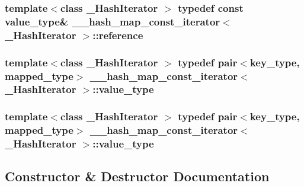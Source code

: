 \subsubsection[{reference}]{\setlength{\rightskip}{0pt plus 5cm}template$<$class \+\_\+\+Hash\+Iterator $>$ typedef const {\bf value\+\_\+type}\& {\bf \+\_\+\+\_\+hash\+\_\+map\+\_\+const\+\_\+iterator}$<$ \+\_\+\+Hash\+Iterator $>$\+::{\bf reference}}\label{class____hash__map__const__iterator_a94a3447535fb67a3c48b0acded52fd84}
\hypertarget{class____hash__map__const__iterator_aa5fda7b5c351e3103cfa5bf694b500b4}{}
\subsubsection[{value\+\_\+type}]{\setlength{\rightskip}{0pt plus 5cm}template$<$class \+\_\+\+Hash\+Iterator $>$ typedef pair$<$key\+\_\+type, mapped\+\_\+type$>$ {\bf \+\_\+\+\_\+hash\+\_\+map\+\_\+const\+\_\+iterator}$<$ \+\_\+\+Hash\+Iterator $>$\+::{\bf value\+\_\+type}}\label{class____hash__map__const__iterator_aa5fda7b5c351e3103cfa5bf694b500b4}
\hypertarget{class____hash__map__const__iterator_aa5fda7b5c351e3103cfa5bf694b500b4}{}
\subsubsection[{value\+\_\+type}]{\setlength{\rightskip}{0pt plus 5cm}template$<$class \+\_\+\+Hash\+Iterator $>$ typedef pair$<$key\+\_\+type, mapped\+\_\+type$>$ {\bf \+\_\+\+\_\+hash\+\_\+map\+\_\+const\+\_\+iterator}$<$ \+\_\+\+Hash\+Iterator $>$\+::{\bf value\+\_\+type}}\label{class____hash__map__const__iterator_aa5fda7b5c351e3103cfa5bf694b500b4}


\subsection{Constructor \& Destructor Documentation}
\hypertarget{class____hash__map__const__iterator_a8901fc740c6c0594c3ef1b58a706bce0}{}
